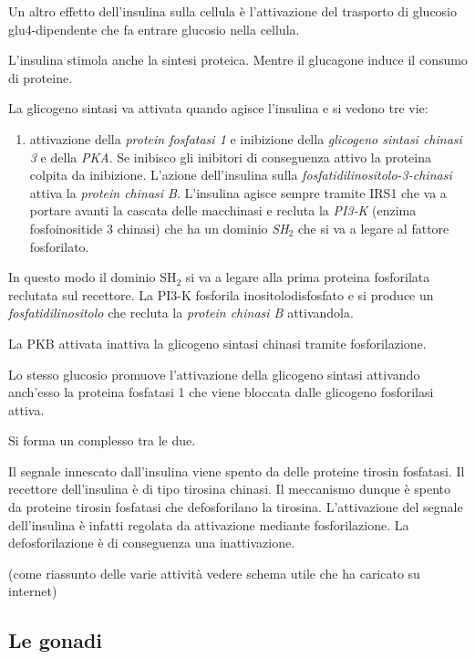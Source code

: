 \documentclass[]{article}
\begin{document}
Un altro effetto dell'insulina sulla cellula è l'attivazione del
trasporto di glucosio glu4-dipendente che fa entrare glucosio nella
cellula.

L'insulina stimola anche la sintesi proteica. Mentre il glucagone induce
il consumo di proteine.

La glicogeno sintasi va attivata quando agisce l'insulina e si vedono
tre vie:

\begin{enumerate}
\def\labelenumi{\arabic{enumi}.}
\itemsep1pt\parskip0pt
\item
  attivazione della \emph{protein fosfatasi 1} e inibizione della
  \emph{glicogeno sintasi chinasi 3} e della \emph{PKA}. Se inibisco gli
  inibitori di conseguenza attivo la proteina colpita da inibizione.
  L'azione dell'insulina sulla \emph{fosfatidilinositolo-3-chinasi}
  attiva la \emph{protein chinasi B}. L'insulina agisce sempre tramite
  IRS1 che va a portare avanti la cascata delle macchinasi e recluta la
  \emph{PI3-K} (enzima fosfoinositide 3 chinasi) che ha un dominio
  \emph{SH\(_2\)} che si va a legare al fattore fosforilato.
\end{enumerate}

In questo modo il dominio SH\(_2\) si va a legare alla prima proteina
fosforilata reclutata sul recettore. La PI3-K fosforila
inositolodisfosfato e si produce un \emph{fosfatidilinositolo} che
recluta la \emph{protein chinasi B} attivandola.

La PKB attivata inattiva la glicogeno sintasi chinasi tramite
fosforilazione.

Lo stesso glucosio promuove l'attivazione della glicogeno sintasi
attivando anch'esso la proteina fosfatasi 1 che viene bloccata dalle
glicogeno fosforilasi attiva.

Si forma un complesso tra le due.

Il segnale innescato dall'insulina viene spento da delle proteine
tirosin fosfatasi. Il recettore dell'insulina è di tipo tirosina
chinasi. Il meccanismo dunque è spento da proteine tirosin fosfatasi che
defosforilano la tirosina. L'attivazione del segnale dell'insulina è
infatti regolata da attivazione mediante fosforilazione. La
defosforilazione è di conseguenza una inattivazione.

(come riassunto delle varie attività vedere schema utile che ha caricato
su internet)

\subsection{Le gonadi}\label{le-gonadi}
\end{document}
